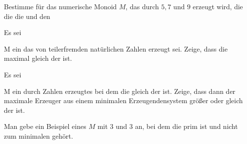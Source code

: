{}
{





Bestimme für das numerische Monoid $M$, das durch $5,7$ und $9$ erzeugt wird, die
 die
 die
 und den





}
{} {}

{}
{





Es sei

\mavergleichskette
{\vergleichskette
{ M
}
{ \subseteq }{ \N
}
{  }{
}
{    }{
}
{   }{
}
}
{}{}{}
ein
das von teilerfremden natürlichen Zahlen erzeugt sei. Zeige, dass die
maximal gleich der
ist.





}
{} {}

{}
{





Es sei

\mavergleichskette
{\vergleichskette
{ M
}
{ \subseteq }{ \N
}
{  }{
}
{    }{
}
{   }{
}
}
{}{}{}
ein durch
Zahlen erzeugtes
bei dem die
gleich der
ist. Zeige, dass dann der maximale Erzeuger aus einem minimalen Erzeugendensystem größer oder gleich der
ist.





}
{} {}

{}
{





Man gebe ein Beispiel eines
$M$ mit
$3$ und
$3$ an, bei dem die
prim ist und nicht zum minimalen
gehört.





}
{} {}

